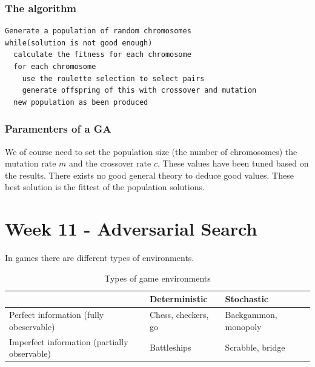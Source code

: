 \documentclass{article}
\begin{document}
\subsubsection{The algorithm}%
\label{ssub:the_algorithm}

\begin{lstlisting}[inputencoding=utf8/latin1, keywordstyle=\color{blue}\bfseries, rulecolor=\color{black}]
Generate a population of random chromosomes
while(solution is not good enough)
  calculate the fitness for each chromosome
  for each chromosome
    use the roulette selection to select pairs
    generate offspring of this with crossover and mutation
  new population as been produced
\end{lstlisting}


\subsubsection{Paramenters of a GA}%
\label{ssub:paramenters_of_a_ga}

We of course need to set the population size (the number of chromosomes) the
mutation rate $m$ and the crossover rate $c$.
These values have been tuned based on the results. There exists no good general
theory to deduce good values.
These best solution is the fittest of the population solutions.




\newpage
\section{Week 11 - Adversarial Search}%
\label{sub:_adversarial_search}

In games there are different types of environments.

\begin{table}[h]
  \centering
  \begin{tabular}{p{3.5cm}   l  l} 
     & \textbf{Deterministic}  & \textbf{Stochastic}  \\\midrule
    Perfect information \newline (fully obeservable) & Chess, checkers, go  &
    Backgammon, monopoly \\ \midrule
    Imperfect information \newline 
    (partially observable) & Battleships & Scrabble, bridge
  \end{tabular}
  \caption{Types of game environments}
  \label{tab:label}
\end{table}
\end{document}
